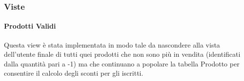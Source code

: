 

\subsubsection{Viste}

\paragraph*{Prodotti Validi}

Questa view \`e stata implementata in modo tale da nascondere alla vista dell'utente finale di tutti quei prodotti che non sono pi\`u in vendita (identificati dalla quantità pari a -1) ma che continuano a popolare la tabella Prodotto per consentire il calcolo degli sconti per gli iscritti.


